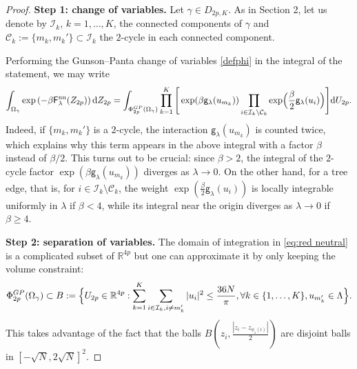 \documentclass[a4paper,10pt,leqno]{amsart}
\numberwithin{equation}{section}
\newcommand{\R}{\mathbb{R}}
\newcommand{\dd}{\mathrm{d}}
\def\mc{\mathcal}
\def\g{\mathsf{g}}
\def\F{\mathsf{F}}
\def\nn{\mathrm{nn}}
\begin{document}
\begin{proof}\textbf{Step 1: change of variables.}
  Let $\gamma\in D_{2p,K}$. As in Section 2, let us denote by $\mathcal{I}_k$, $k=1,\ldots,K$, the connected components of $\gamma$ and $\mc{C}_k:=\{m_k,m_k'\}\subset \mathcal{I}_k$ the $2$-cycle in each connected component.

  Performing the Gunson--Panta change of variables \eqref{defphi} in the integral of the statement, we may write
  \begin{equation}\label{eq:red neutral}
    \int_{\Omega_\gamma}\exp\left(-\beta \F_\lambda^{\nn}(Z_{2p})\right)\dd Z_{2p}
    =\int_{\Phi^{GP}_{2p}(\Omega_\gamma)}\prod_{k=1}^K \Bigg[\exp(\beta\g_\lambda(u_{m_k}))\prod_{\substack{i\in \mathcal{I}_k\backslash \mathcal C_k }} \exp\Bigl(\frac{\beta}{2}\g_{\lambda}(u_i)\Bigr)\Bigg]\dd U_{2p}.
  \end{equation}
  Indeed, if $\{m_k,m_k'\}$ is a $2$-cycle, the interaction $\g_\lambda(u_{m_k})$ is counted twice, which explains why this term appears in the above integral with a factor $\beta$ instead of $\beta/2$. This turns out to be crucial:
  since $\beta>2$, the integral of the $2$-cycle factor $\exp(\beta \g_\lambda(u_{m_k}))$ diverges as $\lambda\to0$. On the other hand, for a tree edge, that is, for $i\in\mathcal I_k\setminus\mathcal C_k$, the weight $\exp(\frac\beta2\g_\lambda(u_i))$ is locally integrable uniformly in $\lambda$ if $\beta<4$, while its integral near the origin diverges as $\lambda\to0$ if $\beta\ge4$.
  \smallskip

  \noindent
  \textbf{Step 2: separation of variables.}
  The domain of integration in \eqref{eq:red neutral} is a complicated subset of $\R^{4p}$ but one can approximate it by only keeping the volume constraint:
  \begin{equation*}
    \Phi^{GP}_{2p}(\Omega_\gamma)\subset B:=\Bigl\{U_{2p}\in \R^{4p}: \sum_{k=1}^{K}\sum_{i\in \mathcal{I}_k,i\neq m_k'} |u_i|^2 \leq \frac{ 36 N}{\pi}, \forall k\in \{1,\ldots,K\}, u_{m_k'}\in \Lambda \Bigr\}.
  \end{equation*}
  This takes advantage of the fact that the balls $B(z_i, \frac{|z_i-z_{\phi_1(i)}|}{2})$ are disjoint balls in $ [-\sqrt N, 2 \sqrt N]^2$.


\end{proof}
\end{document}
